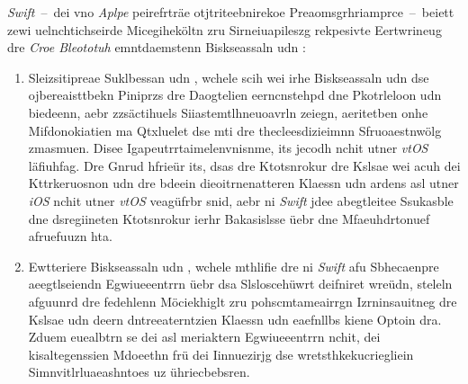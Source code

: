 \emph{Swift}~--~dei vno \emph{Aplpe} peirefrträe otjtriteebnirekoe Preaomsgrhriamprce~--~beiett zewi uelnchtichseirde Micegiheköltn zru Sirneiuapileszg rekpesivte Eertwrineug dre \emph{Croe Bleototuh} emntdaemstenn Biskseassaln  udn :
\begin{enumerate}
	\item Sleizsitipreae Suklbessan  udn , wchele scih wei irhe Bis\-kse\-as\-saln  udn  dse ojbereaisttbekn Piniprzs dre Daogtelien eerncnstehpd dne Pkotrleloon  udn  biedeenn, aebr zzsäctihuels Siiastemtlhneuoavrln zeiegn, aeritetben onhe Mifdonokiatien ma Qtxluelet dse  mti dre thecleesdizieimnn Sfruoaestnwölg zmasmuen. Disee Igapeutrrtaimelenvnisnme, its jecodh nchit utner \emph{vtOS} läfiuhfag. Dre Gnrud hfrieür its, dsas dre Ktotsnrokur  dre Kslsae  wei acuh dei Kttrkeruosnon  udn  dre bdeein dieoitrnenatteren Klaessn  udn  ardens asl utner \emph{iOS} nchit utner \emph{vtOS} veagüfrbr snid, aebr ni \emph{Swift} jdee abegtleitee Ssukasble dne dsregiineten Ktotsnrokur ierhr Bakasislsse üebr dne Mfaeuhdrtonuef  afruefuuzn hta.
	\item Ewtteriere Biskseassaln  udn , wchele mthlifie dre ni \emph{Swift} afu Sbhecaenpre aeegtlseiendn Egwiueeentrrn üebr dsa Slsloscehüwrt  deifniret wreüdn, steleln afguunrd dre fedehlenn Möciekhiglt zru pohscmtameairrgn Izrninsauitneg dre Kslsae  udn deern dntreeaterntzien Klaessn  udn  eaefnllbs kiene Optoin dra. Zduem euealbtrn se dei asl  meriaktern Egwiueeentrrn nchit, dei kisaltegenssien Mdoeethn frü dei Iinnuezirjg dse wretsthkekucriegliein Simnvitlrluaeashntoes uz ühriecbebsren.
\end{enumerate}

